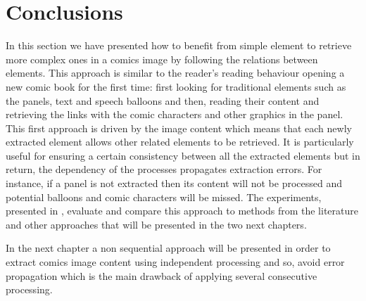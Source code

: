\section{Conclusions}
\label{sec:se:conclusion}
In this section we have presented how to benefit from simple element to retrieve more complex ones in a comics image by following the relations between elements.
This approach is similar to the reader's reading behaviour opening a new comic book for the first time: first looking for traditional elements such as the panels, text and speech balloons and then, reading their content and retrieving the links with the comic characters and other graphics in the panel.
This first approach is driven by the image content which means that each newly extracted element allows other related elements to be retrieved.
It is particularly useful for ensuring a certain consistency between all the extracted elements but in return, the dependency of the processes propagates extraction errors.
For instance, if a panel is not extracted then its content will not be processed and potential balloons and comic characters will be missed.
The experiments, presented in , evaluate and compare this approach to methods from the literature and other approaches that will be presented in the two next chapters.



In the next chapter a non sequential approach will be presented in order to extract comics image content using independent processing and so, avoid error propagation which is the main drawback of applying several consecutive processing.



